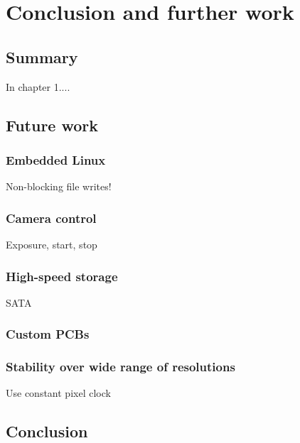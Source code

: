 \chapter{Conclusion and further work}






\section{Summary}

In chapter 1....

\section{Future work}

\subsection{Embedded Linux}

Non-blocking file writes!

\subsection{Camera control}

Exposure, start, stop

\subsection{High-speed storage}

SATA

\subsection{Custom PCBs}

\subsection{Stability over wide range of resolutions}

Use constant pixel clock

\section{Conclusion}
